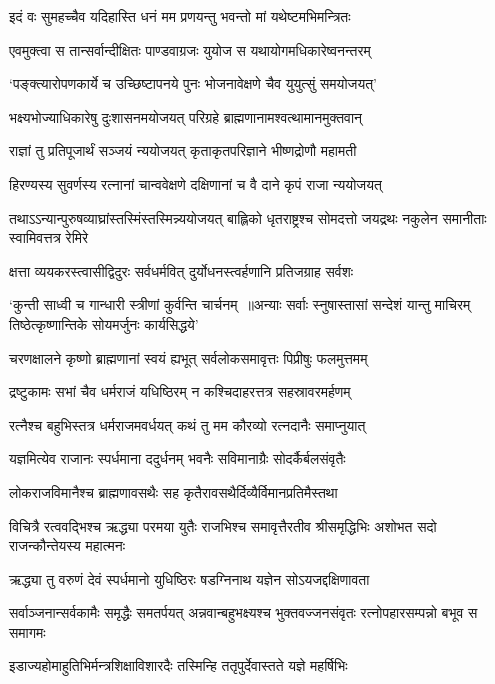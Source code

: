 \twolineshloka
{इदं वः सुमहच्चैव यदिहास्ति धनं मम}
{प्रणयन्तु भवन्तो मां यथेष्टमभिमन्त्रितः}


\twolineshloka
{एवमुक्त्वा स तान्सर्वान्दीक्षितः पाण्डवाग्रजः}
{युयोज स यथायोगमधिकारेष्वनन्तरम्}


\twolineshloka
{`पङ्क्त्यारोपणकार्ये च उच्छिष्टापनये पुनः}
{भोजनावेक्षणे चैव युयुत्सुं समयोजयत्'}


\threelineshloka
{भक्ष्यभोज्याधिकारेषु दुःशासनमयोजयत्}
{परिग्रहे ब्राह्मणानामश्वत्थामानमुक्तवान्}
{}


\twolineshloka
{राज्ञां तु प्रतिपूजार्थं सञ्जयं न्ययोजयत्}
{कृताकृतपरिज्ञाने भीष्णद्रोणौ महामती}


\twolineshloka
{हिरण्यस्य सुवर्णस्य रत्नानां चान्ववेक्षणे}
{दक्षिणानां च वै दाने कृपं राजा न्ययोजयत्}


\threelineshloka
{तथाऽऽन्यान्पुरुषव्याघ्रांस्तस्मिंस्तस्मिन्न्ययोजयत्}
{बाह्लिको धृतराष्ट्रश्च सोमदत्तो जयद्रथः}
{नकुलेन समानीताः स्वामिवत्तत्र रेमिरे}


\twolineshloka
{क्षत्ता व्ययकरस्त्वासीद्विदुरः सर्वधर्मवित्}
{दुर्योधनस्त्वर्हणानि प्रतिजग्राह सर्वशः}


\twolineshloka
{`कुन्ती साध्वी च गान्धारी स्त्रीणां कुर्वन्ति चार्चनम् ॥अन्याः सर्वाः स्नुषास्तासां सन्देशं यान्तु माचिरम्}
{तिष्ठेत्कृष्णान्तिके सोयमर्जुनः कार्यसिद्धये'}


\twolineshloka
{चरणक्षालने कृष्णो ब्राह्मणानां स्वयं ह्यभूत्}
{सर्वलोकसमावृत्तः पिप्रीषुः फलमुत्तमम्}


\twolineshloka
{द्रष्टुकामः सभां चैव धर्मराजं यधिष्ठिरम्}
{न कश्चिदाहरत्तत्र सहस्रावरमर्हणम्}


\twolineshloka
{रत्नैश्च बहुभिस्तत्र धर्मराजमवर्धयत्}
{कथं तु मम कौरव्यो रत्नदानैः समाप्नुयात्}


\twolineshloka
{यज्ञमित्येव राजानः स्पर्धमाना ददुर्धनम्}
{भवनैः सविमानाग्रैः सोदर्कैर्बलसंवृतैः}


\twolineshloka
{लोकराजविमानैश्च ब्राह्मणावसथैः सह}
{कृतैरावसथैर्दिव्यैर्विमानप्रतिमैस्तथा}


\threelineshloka
{विचित्रै रत्ववद्भिश्च ऋद्ध्या परमया युतैः}
{राजभिश्च समावृत्तैरतीव श्रीसमृद्धिभिः}
{अशोभत सदो राजन्कौन्तेयस्य महात्मनः}


\twolineshloka
{ऋद्ध्या तु वरुणं देवं स्पर्धमानो युधिष्ठिरः}
{षडग्निनाथ यज्ञेन सोऽयजद्दक्षिणावता}


\threelineshloka
{सर्वाञ्जनान्सर्वकामैः समृद्धैः समतर्पयत्}
{अन्नवान्बहुभक्ष्यश्च भुक्तवज्जनसंवृतः}
{रत्नोपहारसम्पन्नो बभूव स समागमः}


\twolineshloka
{इडाज्यहोमाहुतिभिर्मन्त्रशिक्षाविशारदैः}
{तस्मिन्हि ततृपुर्देवास्तते यज्ञे महर्षिभिः}


